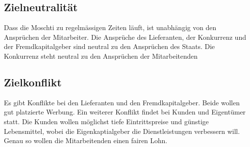 \documentclass[a4paper, titlepage]{article}
\begin{document}
\subsection{Zielneutralität}
Dass die Moschti zu regelmässigen Zeiten läuft, ist unabhängig von den Ansprüchen der Mitarbeiter. 
Die Ansprüche des Lieferanten, der Konkurrenz und der Fremdkapitalgeber sind neutral zu den Ansprüchen des Staats.
Die Konkurrenz steht neutral zu den Ansprüchen der Mitarbeitenden
\subsection{Zielkonflikt}
Es gibt Konflikte bei den Lieferanten und den Fremdkapitalgeber. Beide wollen gut platzierte Werbung. 
Ein weiterer Konflikt findet bei Kunden und Eigentümer statt. Die Kunden wollen möglichst tiefe Eintrittspreise und günstige Lebensmittel, wobei die Eigenkaptialgeber die Dienstleistungen verbessern will.
Genau so wollen die Mitarbeitenden einen fairen Lohn.
\end{document}
